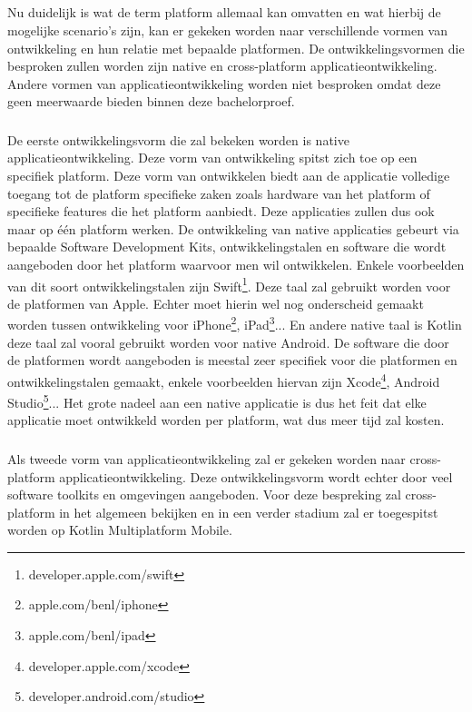 \subsection{}
\label{sec:SVZontwikkelingsvormen}

Nu duidelijk is wat de term platform allemaal kan omvatten en wat hierbij de mogelijke scenario's zijn, kan er gekeken worden naar verschillende vormen van ontwikkeling en hun relatie met bepaalde platformen. De ontwikkelingsvormen die besproken zullen worden zijn native en cross-platform applicatieontwikkeling. Andere vormen van applicatieontwikkeling worden niet besproken omdat deze geen meerwaarde bieden binnen deze bachelorproef.

\subsubsection{}
\label{sec:SVZnative}
De eerste ontwikkelingsvorm die zal bekeken worden is native applicatieontwikkeling. Deze vorm van ontwikkeling spitst zich toe op een specifiek platform. Deze vorm van ontwikkelen biedt aan de applicatie volledige toegang tot de platform specifieke zaken zoals hardware van het platform of specifieke features die het platform aanbiedt.\autocite{RahulRaj2012} Deze applicaties zullen dus ook maar op één platform werken. De ontwikkeling van native applicaties gebeurt via bepaalde Software Development Kits, ontwikkelingstalen en software die wordt aangeboden door het platform waarvoor men wil ontwikkelen.\autocite{Lim2015} Enkele voorbeelden van dit soort ontwikkelingstalen zijn Swift\footnote{developer.apple.com/swift}. Deze taal zal gebruikt worden voor de platformen van Apple. Echter moet hierin wel nog onderscheid gemaakt worden tussen ontwikkeling voor iPhone\footnote{apple.com/benl/iphone}, iPad\footnote{apple.com/benl/ipad}... En andere native taal is Kotlin deze taal zal vooral gebruikt worden voor native Android. De software die door de platformen wordt aangeboden is meestal zeer specifiek voor die platformen en ontwikkelingstalen gemaakt, enkele voorbeelden hiervan zijn Xcode\footnote{developer.apple.com/xcode}, Android Studio\footnote{developer.android.com/studio}... Het grote nadeel aan een native applicatie is dus het feit dat elke applicatie moet ontwikkeld worden per platform, wat dus meer tijd zal kosten.


\subsubsection{}
\label{sec:SVZcrossplatform}
Als tweede vorm van applicatieontwikkeling zal er gekeken worden naar cross-platform applicatieontwikkeling. Deze ontwikkelingsvorm wordt echter door veel software toolkits en omgevingen aangeboden. Voor deze bespreking zal cross-platform in het algemeen bekijken en in een verder stadium zal er toegespitst worden op Kotlin Multiplatform Mobile.

